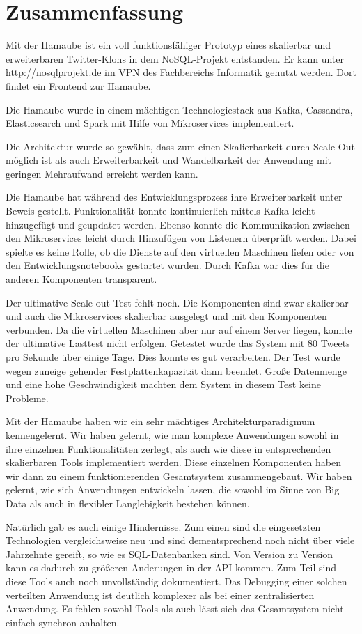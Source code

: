 \chapter{Zusammenfassung}
Mit der Hamaube ist ein voll funktionsfähiger Prototyp eines skalierbar
und erweiterbaren Twitter-Klons in dem NoSQL-Projekt entstanden. Er kann
unter \url{http://nosqlprojekt.de} im VPN des Fachbereichs Informatik genutzt
werden. Dort findet ein Frontend zur Hamaube.

Die Hamaube wurde in einem mächtigen Technologiestack aus Kafka,
Cassandra, Elasticsearch und Spark mit Hilfe von Mikroservices
implementiert.

Die Architektur wurde so gewählt, dass zum einen Skalierbarkeit durch
Scale-Out möglich ist als auch Erweiterbarkeit und Wandelbarkeit der
Anwendung mit geringen Mehraufwand erreicht werden kann.

Die Hamaube hat während des Entwicklungsprozess ihre Erweiterbarkeit
unter Beweis gestellt. Funktionalität konnte kontinuierlich mittels
Kafka leicht hinzugefügt und geupdatet werden. Ebenso konnte die
Kommunikation zwischen den Mikroservices leicht durch Hinzufügen von
Listenern überprüft werden. Dabei spielte es keine Rolle, ob die
Dienste auf den virtuellen Maschinen liefen oder von den
Entwicklungsnotebooks gestartet wurden. Durch Kafka war dies für die
anderen Komponenten transparent.

Der ultimative Scale-out-Test fehlt noch. Die Komponenten sind zwar
skalierbar und auch die Mikroservices skalierbar ausgelegt und mit den
Komponenten verbunden. Da die virtuellen Maschinen aber nur auf einem
Server liegen, konnte der ultimative Lasttest nicht erfolgen. Getestet
wurde das System mit 80 Tweets pro Sekunde über einige Tage. Dies
konnte es gut verarbeiten. Der Test wurde wegen zuneige gehender
Festplattenkapazität dann beendet. Große Datenmenge und eine hohe
Geschwindigkeit machten dem System in diesem Test keine Probleme.

Mit der Hamaube haben wir ein sehr mächtiges Architekturparadigmum
kennengelernt. Wir haben gelernt, wie man komplexe Anwendungen sowohl
in ihre einzelnen Funktionalitäten zerlegt, als auch wie diese in
entsprechenden skalierbaren Tools implementiert werden. Diese einzelnen
Komponenten haben wir dann zu einem funktionierenden Gesamtsystem
zusammengebaut. Wir haben gelernt, wie sich Anwendungen entwickeln
lassen, die sowohl im Sinne von Big Data als auch in flexibler
Langlebigkeit bestehen können.

Natürlich gab es auch einige Hindernisse. Zum einen sind die
eingesetzten Technologien vergleichsweise neu und sind dementsprechend
noch nicht über viele Jahrzehnte gereift, so wie es SQL-Datenbanken
sind. Von Version zu Version kann es dadurch zu größeren Änderungen in
der API kommen. Zum Teil sind diese Tools auch noch unvollständig
dokumentiert. Das Debugging einer solchen verteilten Anwendung ist 
deutlich komplexer als bei einer zentralisierten Anwendung. Es fehlen
sowohl Tools als auch lässt sich das Gesamtsystem nicht einfach
synchron anhalten.

